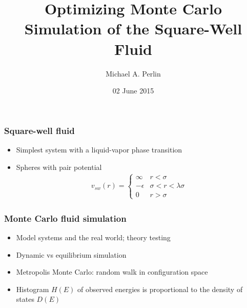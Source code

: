\documentclass[xcolor=dvipsnames]{beamer}
\title[Optimizing MC Simulation of the SW Fluid]
{Optimizing Monte Carlo Simulation of the Square-Well Fluid}
\author[M. A. Perlin]{Michael A. Perlin}
\institute{\bf Department of Physics, Oregon State University}
\date{02 June 2015}
\newcommand{\p}[1]{\left(#1\right)} %
\let\olditem\item
\renewcommand{\item}{\setlength{\itemsep}{6pt}\olditem}
\begin{document}
\begin{frame}
  \maketitle
\end{frame}


\begin{frame}
  \frametitle{Square-well fluid}
  \begin{itemize}
  \item Simplest system with a liquid-vapor phase transition
  \item Spheres with pair potential
  \begin{align*}
    v_{sw}\p{r}=\left\{
      \begin{array}{ll}
        \infty & r<\sigma \\
        -\epsilon & \sigma<r<\lambda\sigma \\
        0 & r>\sigma
      \end{array}
    \right.
  \end{align*}
  \end{itemize}
\end{frame}


\begin{frame}
  \frametitle{Monte Carlo fluid simulation}
  \begin{itemize}
  \item Model systems and the real world; theory testing
  \item Dynamic vs equilibrium simulation
  \item Metropolis Monte Carlo: random walk in configuration space
  \item Histogram $H\p{E}$ of observed energies is proportional to the
    density of states $D\p{E}$
  \end{itemize}
\end{frame}
\end{document}
